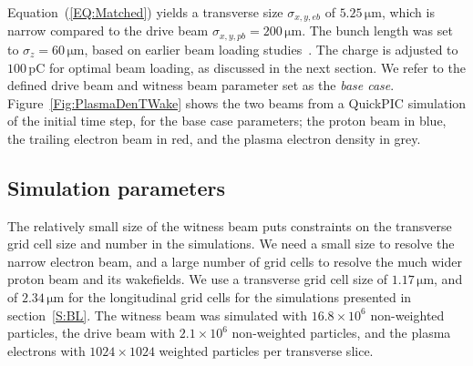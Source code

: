 \documentclass[aps,prstab,reprint,amsmath,amssymb,groupedaddress]{revtex4-1}
\newcommand{\unit}[1]{\,\mathrm{#1}}
\newcommand{\nexp}[1]{\times 10^{#1}}
\begin{document}
Equation~(\ref{EQ:Matched}) yields a transverse size $\sigma_{x,y,eb}$ of $5.25\unit{\mu m}$, which is narrow compared
to the drive beam $\sigma_{x,y,pb} = 200\unit{\mu m}$. The bunch length was set to $\sigma_{z} = 60\unit{\mu m}$, based
on earlier beam loading studies~\cite{berglyd_olsen:2016}. The charge is adjusted to $100\unit{pC}$ for optimal beam
loading, as discussed in the next section. We refer to the defined drive beam and witness beam parameter set as the
\emph{base case}. Figure~\ref{Fig:PlasmaDenTWake} shows the two beams from a QuickPIC simulation of the initial time
step, for the base case parameters; the proton beam in blue, the trailing electron beam in red, and the plasma electron
density in grey. 



\subsection{Simulation parameters}\label{SIM}

The relatively small size of the witness beam puts constraints on the transverse grid cell size and number in the
simulations. We need a small size to resolve the narrow electron beam, and a large number of grid cells to resolve the
much wider proton beam and its wakefields. We use a transverse grid cell size of $1.17\unit{\mu m}$, and of
$2.34\unit{\mu m}$ for the longitudinal grid cells for the simulations presented in section~\ref{S:BL}. The witness beam
was simulated with $16.8\nexp{6}$ non-weighted particles, the drive beam with $2.1\nexp{6}$ non-weighted particles, and
the plasma electrons with $1024 \times 1024$ weighted particles per transverse slice.
\end{document}
